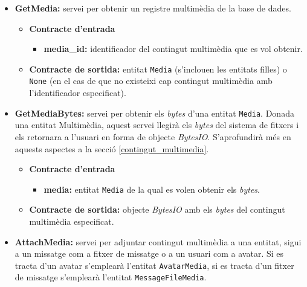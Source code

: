 		\begin{itemize}

			\item \textbf{GetMedia:} servei per obtenir un registre multimèdia de la base de dades.
				\begin{itemize}
					\item \textbf{Contracte d'entrada}
						\begin{itemize}
							\item \textbf{media\_id:} identificador del contingut multimèdia que es vol obtenir.
						\end{itemize}
					\item \textbf{Contracte de sortida:} entitat \texttt{Media} (s'inclouen les entitats filles) o \texttt{None} (en el cas de que no existeixi cap contingut multimèdia amb l'identificador especificat).
				\end{itemize}
				
			\item \textbf{GetMediaBytes:} servei per obtenir els \emph{bytes} d'una entitat \texttt{Media}. Donada una entitat Multimèdia, aquest servei llegirà els \emph{bytes} del sistema de fitxers i els retornara a l'usuari en forma de objecte \emph{BytesIO}. S'aprofundirà més en aquests aspectes a la secció \ref{contingut_multimedia}.
			
				\begin{itemize}
					\item \textbf{Contracte d'entrada}
						\begin{itemize}
							\item \textbf{media:} entitat \texttt{Media} de la qual es volen obtenir els \emph{bytes}.
						\end{itemize}
					\item \textbf{Contracte de sortida:}  objecte \emph{BytesIO} amb els \emph{bytes} del contingut multimèdia especificat.
				\end{itemize}
				
			\item \textbf{AttachMedia:} servei per adjuntar contingut multimèdia a una entitat, sigui a un missatge com a fitxer de missatge o a un usuari com a avatar. Si es tracta d'un avatar s'emplearà l'entitat \texttt{AvatarMedia}, si es tracta d'un fitxer de missatge s'emplearà l'entitat \texttt{MessageFileMedia}.
			

\end{itemize}
